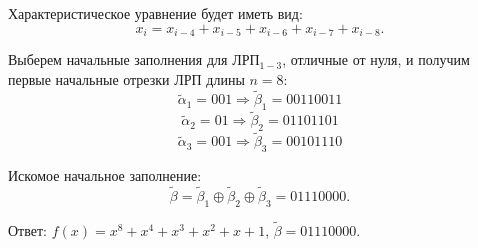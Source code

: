 Характеристическое уравнение будет иметь вид:
$$x_i = x_{i-4} + x_{i-5} + x_{i-6} + x_{i-7} + x_{i-8}.$$

Выберем начальные заполнения для ЛРП$_{1-3}$, отличные от нуля, и получим первые начальные отрезки ЛРП длины $n=8$:
$$\widetilde \alpha _1 = 001 \Rightarrow \widetilde \beta _1 = 00110011$$
$$\widetilde \alpha _2 = 01 \Rightarrow \widetilde \beta _2  = 01101101$$
$$\widetilde \alpha _3 = 001 \Rightarrow \widetilde \beta _3 = 00101110$$

Искомое начальное заполнение:
$$\widetilde \beta = \widetilde \beta _1 \oplus \widetilde \beta _2 \oplus \widetilde \beta _3 = 01110000.$$

Ответ: $f(x) = x^8 + x^4 + x^3 + x^2 + x + 1$, $\widetilde \beta = 01110000$. 

